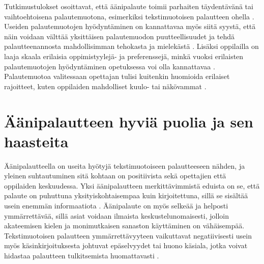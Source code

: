 \documentclass[utf8]{gradu3}
\begin{document}
Tutkimustulokset osoittavat, että äänipalaute toimii parhaiten täydentävänä tai vaihtoehtoisena palautemuotona, esimerkiksi tekstimuotoisen palautteen ohella \parencite{academics, modes, ice}. Useiden palautemuotojen hyödyntäminen on kannattavaa myös siitä syystä, että näin voidaan välttää yksittäisen palautemuodon puutteellisuudet ja tehdä palautteenannosta mahdollisimman tehokasta ja mielekästä \parencite{modes}. Lisäksi oppilailla on laaja skaala erilaisia oppimistyylejä- ja preferenssejä, minkä vuoksi erilaisten palautemuotojen hyödyntäminen opetuksessa voi olla kannattavaa \parencite{style}. Palautemuotoa valitessaan opettajan tulisi kuitenkin huomioida erilaiset rajoitteet, kuten oppilaiden mahdolliset kuulo- tai näkövammat \parencite{evaluating}.

\section{Äänipalautteen hyviä puolia ja sen haasteita}

Äänipalautteella on useita hyötyjä tekstimuotoiseen palautteeseen nähden, ja yleinen suhtautuminen sitä kohtaan on positiivista sekä opettajien että oppilaiden keskuudessa. Yksi äänipalautteen merkittävimmistä eduista on se, että palaute on puhuttuna yksityiskohtaisempaa kuin kirjoitettuna, sillä se sisältää usein enemmän informaatiota \parencite{attitudes}. Äänipalaute on myös selkeää ja helposti ymmärrettävää, sillä asiat voidaan ilmaista keskustelunomaisesti, jolloin akateemisen kielen ja monimutkaisen sanaston käyttäminen on vähäisempää. Tekstimuotoisen palautteen ymmärrettävyyteen vaikuttavat negatiivisesti usein myös käsinkirjoituksesta johtuvat epäselvyydet tai huono käsiala, jotka voivat hidastaa palautteen tulkitsemista huomattavasti \parencite{developing}.
\end{document}
